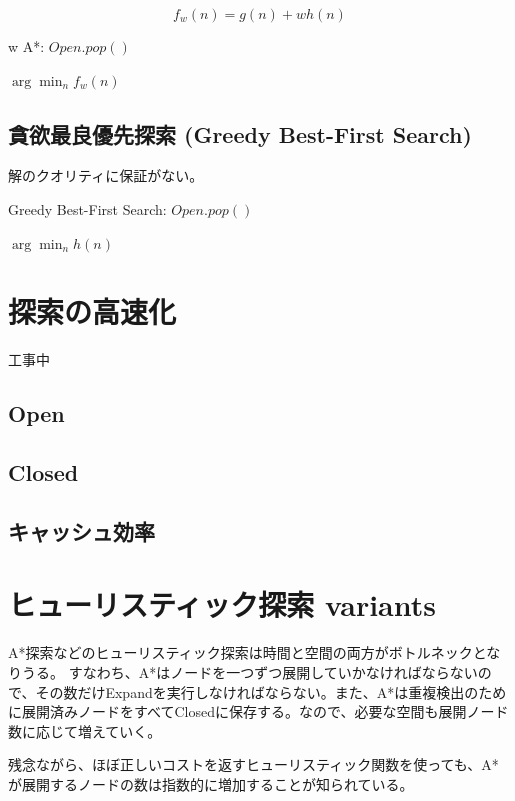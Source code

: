 \documentclass{report}
\begin{document}
\begin{equation}
	f_w(n) = g(n) + w h(n)
\end{equation}

\begin{algorithm}
\caption{w A*: $Open.pop()$}
\label{alg:wastar-open}
	\Return $\arg \min_n f_w(n)$
\end{algorithm}

\section{貪欲最良優先探索 (Greedy Best-First Search)}
\label{sec:greedy-best-first-search}

解のクオリティに保証がない。

\begin{algorithm}
\caption{Greedy Best-First Search: $Open.pop()$}
\label{alg:gfs-open}
	\Return $\arg \min_n h(n)$
\end{algorithm}




\chapter{探索の高速化}
\label{ch:search-performance}
工事中
\section{Open}
\section{Closed}
\section{キャッシュ効率}


\chapter{ヒューリスティック探索 variants}
\label{ch:heuristic-serach-variants}
A*探索などのヒューリスティック探索は時間と空間の両方がボトルネックとなりうる。
すなわち、A*はノードを一つずつ展開していかなければならないので、その数だけExpandを実行しなければならない。また、A*は重複検出のために展開済みノードをすべてClosedに保存する。なので、必要な空間も展開ノード数に応じて増えていく。

残念ながら、ほぼ正しいコストを返すヒューリスティック関数を使っても、A*が展開するノードの数は指数的に増加することが知られている\cite{}。
\end{document}
